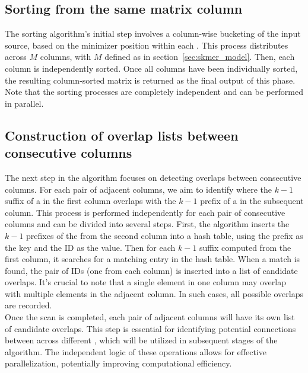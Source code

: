 \subsection{Sorting \kmers from the same matrix column}
\label{sec:skmersorting}
The sorting algorithm's initial step involves a column-wise bucketing of the input \kmer source, based on the minimizer position within each \kmer. This process distributes \kmers across $M$ columns, with $M$ defined as in section~\ref{sec:skmer_model}. Then, each column is independently sorted. Once all columns have been individually sorted, the resulting column-sorted matrix is returned as the final output of this phase. Note that the sorting processes are completely independent and can be performed in parallel.\\

\subsection{Construction of overlap lists between consecutive columns}
\label{sec:skmeroverlap}
The next step in the algorithm focuses on detecting overlaps between consecutive columns. For each pair of adjacent columns, we aim to identify where the $k-1$ suffix of a \kmer in the first column overlaps with the $k-1$ prefix of a \kmer in the subsequent column. This process is performed independently for each pair of consecutive columns and can be divided into several steps. First, the algorithm inserts the $k-1$ prefixes of the \kmers from the second column into a hash table, using the prefix as the key and the \skmer ID as the value. Then for each $k-1$ suffix computed from the first column, it searches for a matching entry in the hash table. When a match is found, the pair of \skmer IDs (one from each column) is inserted into a list of candidate overlaps. It's crucial to note that a single element in one column may overlap with multiple elements in the adjacent column. In such cases, all possible overlaps are recorded.\\
Once the scan is completed, each pair of adjacent columns will have its own list of candidate overlaps. This step is essential for identifying potential connections between \kmers across different \skmers, which will be utilized in subsequent stages of the algorithm. The independent logic of these operations allows for effective parallelization, potentially improving computational efficiency.

